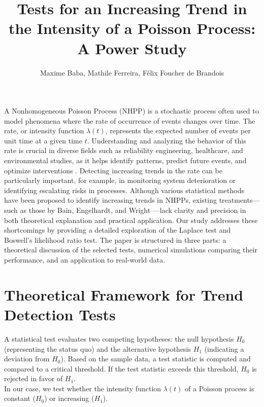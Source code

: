\documentclass{journalstyle}
\title{Tests for an Increasing Trend in the Intensity of a Poisson Process: A Power Study}
\author{Maxime Baba, Mathile Ferreira, Félix Foucher de Brandois}
\begin{document}
\maketitle





A Nonhomogeneous Poisson Process (NHPP) is a stochastic process often used to model phenomena where the rate of occurrence of events changes over time.
The rate, or intensity function $\lambda(t)$, represents the expected number of events per unit time at a given time $t$.
Understanding and analyzing the behavior of this rate is crucial in diverse fields such as reliability engineering, healthcare, and environmental studies, as it helps identify patterns, predict future events, and optimize interventions \cite{ExampleIntervention}.
Detecting increasing trends in the rate can be particularly important, for example, in monitoring system deterioration or identifying escalating risks in processes.
Although various statistical methods have been proposed to identify increasing trends in NHPPs, existing treatments—such as those by Bain, Engelhardt, and Wright \cite{BainEngelhardtWright}—lack clarity and precision in both theoretical explanation and practical application.
Our study addresses these shortcomings by providing a detailed exploration of the Laplace test and Boswell’s likelihood ratio test.
The paper is structured in three parts: a theoretical discussion of the selected tests, numerical simulations comparing their performance, and an application to real-world data.


\section{Theoretical Framework for Trend Detection Tests}

A statistical test evaluates two competing hypotheses: the null hypothesis $H_0$ (representing the status quo) and the alternative hypothesis $H_1$ (indicating a deviation from $H_0$).
Based on the sample data, a test statistic is computed and compared to a critical threshold.
If the test statistic exceeds this threshold, $H_0$ is rejected in favor of $H_1$. \\
In our case, we test whether the intensity function $\lambda(t)$ of a Poisson process is constant ($H_0$) or increasing ($H_1$).
\end{document}
